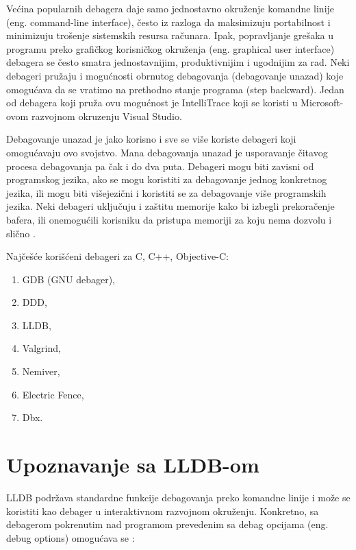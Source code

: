 \documentclass[a4paper]{article}
\begin{document}
Većina popularnih debagera daje samo jednostavno okruženje komandne linije (eng. command-line interface), često iz razloga da maksimizuju portabilnost i minimizuju trošenje sistemskih resursa računara. Ipak, popravljanje grešaka u programu preko grafičkog korisničkog okruženja (eng. graphical user interface) debagera se često smatra jednostavnijim, produktivnijim i ugodnijim za rad. Neki debageri pružaju i mogućnosti obrnutog debagovanja (debagovanje unazad) koje omogućava da se vratimo na prethodno stanje programa (step backward). Jedan od debagera koji pruža ovu mogućnost je IntelliTrace koji se koristi u Microsoft-ovom razvojnom okruzenju Visual Studio. 

Debagovanje unazad je jako korisno i sve se više koriste debageri koji omogućavaju ovo svojstvo. Mana debagovanja unazad je usporavanje čitavog procesa debagovanja pa čak i do dva puta. Debageri mogu biti zavisni od programskog jezika, ako se mogu koristiti za debagovanje jednog konkretnog jezika, ili mogu biti višejezični i koristiti se za debagovanje više programskih jezika. Neki debageri uključuju i zaštitu memorije kako bi izbegli prekoračenje bafera, ili onemogućili korisniku da pristupa memoriji za koju nema dozvolu i slično \cite{ssq_debug_def}.

Najčešće korišćeni debageri za  C, C++, Objective-C\cite{ll_best_debuggers}\cite{up_best_debuggers}:
\begin{enumerate}
	\item GDB (GNU debager),
	\item DDD,
	\item LLDB,
	\item Valgrind,
	\item Nemiver,
	\item Electric Fence,
	\item Dbx.
\end{enumerate}

\section{Upoznavanje sa LLDB-om}
LLDB podržava standardne funkcije debagovanja preko komandne linije i može se
koristiti kao debager u interaktivnom razvojnom okruženju. Konkretno, sa
debagerom pokrenutim nad programom prevedenim sa debag opcijama (eng. debug
options) omogućava se \cite{lldb_to_gdb_map}:
\end{document}
